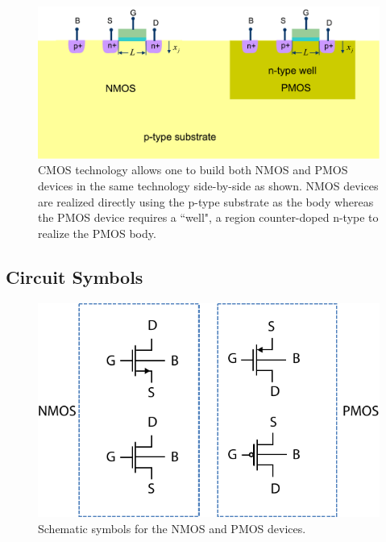  

\begin{figure}[tb]
\begin{center}
\includegraphics[width=.85\columnwidth]{cmos_xsect}
\end{center}
\caption{CMOS technology allows one to build both NMOS and PMOS devices in the same technology side-by-side as shown.  NMOS devices are realized directly using the p-type substrate as the body whereas the PMOS device requires a ``well", a region counter-doped n-type to realize the PMOS body.} \label{fig:cmos_xsect}
\end{figure}

 




\subsection{Circuit Symbols}

\begin{figure}[tb]
\begin{center}
\includegraphics[width=.6\columnwidth]{mos_symbols}
\end{center}
\caption{Schematic symbols for the NMOS and PMOS devices. } \label{fig:mos_symbols}
\end{figure}

